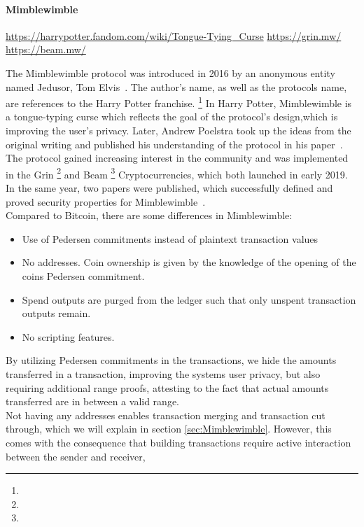 \paragraph{Mimblewimble}

\urldef\urlharrypotter\url{https://harrypotter.fandom.com/wiki/Tongue-Tying_Curse}
\urldef\urlgrin\url{https://grin.mw/}
\urldef\urlbeam\url{https://beam.mw/}

The Mimblewimble protocol was introduced in 2016 by an anonymous entity named Jedusor, Tom Elvis~\cite{jedusor2016mimblewimble}. The author's name, as well as the protocols name,
are references to the Harry Potter franchise. \footnote{\urlharrypotter} In Harry Potter, Mimblewimble is a tongue-typing curse which reflects
the goal of the protocol's design,which is improving the user's privacy.
Later, Andrew Poelstra took up the ideas from the original writing and published his understanding of the protocol in his paper~\cite{poelstra2016mimblewimble}.
The protocol gained increasing interest in the community and was implemented in the Grin \footnote{\urlgrin} and Beam \footnote{\urlbeam} Cryptocurrencies, which both launched in early 2019. In the same year,
two papers were published, which successfully defined and proved security properties for Mimblewimble~\cite{fuchsbauer2019aggregate,betarte2019towards}.
\\
Compared to Bitcoin, there are some differences in Mimblewimble:
\begin{itemize}
    \item Use of Pedersen commitments instead of plaintext transaction values
    \item No addresses. Coin ownership is given by the knowledge of the opening of the coins Pedersen commitment.
    \item Spend outputs are purged from the ledger such that only unspent transaction outputs remain.
    \item No scripting features.
\end{itemize}
By utilizing Pedersen commitments in the transactions, we hide the amounts transferred in a transaction,
improving the systems user privacy, but also requiring additional range proofs, attesting to the fact that actual amounts transferred are in between a valid range.\\
Not having any addresses enables transaction merging and transaction cut through, which we will explain in section \ref{sec:Mimblewimble}.
However, this comes with the consequence that building transactions require active interaction between the sender and receiver,
